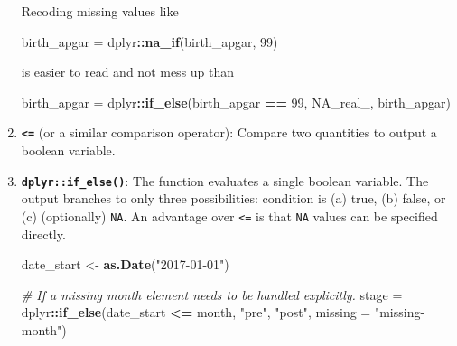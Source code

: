 \documentclass[
]{book}
\newenvironment{Shaded}{\begin{snugshade}}{\end{snugshade}}
\newcommand{\CommentTok}[1]{\textcolor[rgb]{0.56,0.35,0.01}{\textit{#1}}}
\newcommand{\DataTypeTok}[1]{\textcolor[rgb]{0.13,0.29,0.53}{#1}}
\newcommand{\DecValTok}[1]{\textcolor[rgb]{0.00,0.00,0.81}{#1}}
\newcommand{\KeywordTok}[1]{\textcolor[rgb]{0.13,0.29,0.53}{\textbf{#1}}}
\newcommand{\NormalTok}[1]{#1}
\newcommand{\OperatorTok}[1]{\textcolor[rgb]{0.81,0.36,0.00}{\textbf{#1}}}
\newcommand{\OtherTok}[1]{\textcolor[rgb]{0.56,0.35,0.01}{#1}}
\newcommand{\StringTok}[1]{\textcolor[rgb]{0.31,0.60,0.02}{#1}}
\begin{document}
\begin{enumerate}
  Recoding missing values like

\begin{Shaded}
\begin{Highlighting}[]
\NormalTok{birth\_apgar =}\StringTok{ }\NormalTok{dplyr}\OperatorTok{::}\KeywordTok{na\_if}\NormalTok{(birth\_apgar, }\DecValTok{99}\NormalTok{)}
\end{Highlighting}
\end{Shaded}

  is easier to read and not mess up than

\begin{Shaded}
\begin{Highlighting}[]
\NormalTok{birth\_apgar =}\StringTok{ }\NormalTok{dplyr}\OperatorTok{::}\KeywordTok{if\_else}\NormalTok{(birth\_apgar }\OperatorTok{==}\StringTok{ }\DecValTok{99}\NormalTok{, }\OtherTok{NA\_real\_}\NormalTok{, birth\_apgar)}
\end{Highlighting}
\end{Shaded}
\item
  \textbf{\texttt{\textless{}=}} (or a similar comparison operator): Compare two quantities to output a boolean variable.
\item
  \textbf{\texttt{dplyr::if\_else()}}: The function evaluates a single boolean variable. The output branches to only three possibilities: condition is (a) true, (b) false, or (c) (optionally) \texttt{NA}. An advantage over \texttt{\textless{}=} is that \texttt{NA} values can be specified directly.

\begin{Shaded}
\begin{Highlighting}[]
\NormalTok{date\_start \textless{}{-}}\StringTok{ }\KeywordTok{as.Date}\NormalTok{(}\StringTok{"2017{-}01{-}01"}\NormalTok{)}

\CommentTok{\# If a missing month element needs to be handled explicitly.}
\NormalTok{stage       =}\StringTok{ }\NormalTok{dplyr}\OperatorTok{::}\KeywordTok{if\_else}\NormalTok{(date\_start }\OperatorTok{\textless{}=}\StringTok{ }\NormalTok{month, }\StringTok{"pre"}\NormalTok{, }\StringTok{"post"}\NormalTok{, }\DataTypeTok{missing =} \StringTok{"missing{-}month"}\NormalTok{)}


\end{Highlighting}
\end{Shaded}
\end{enumerate}
\end{document}
